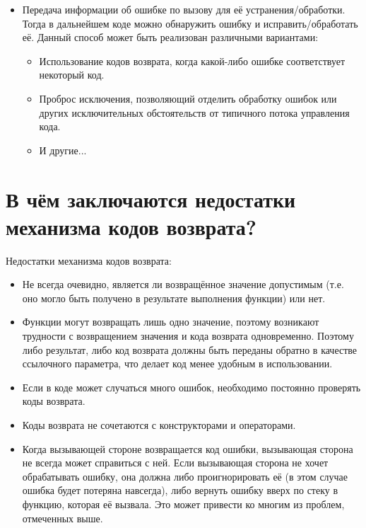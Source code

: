 \documentclass[a4paper,12pt]{article}	%
\begin{document}
\begin{itemize}
		\item Передача информации об ошибке по вызову для её устранения/обработки. Тогда в дальнейшем коде можно обнаружить ошибку и исправить/обработать её. Данный способ может быть реализован различными вариантами:

		\begin{itemize}
		
			\item Использование кодов возврата, когда какой-либо ошибке соответствует некоторый код.

			\item Проброс исключения, позволяющий отделить обработку ошибок или других исключительных обстоятельств от типичного потока управления кода.
		
			\item И другие...
	
		\end{itemize}
	
	\end{itemize}

\newpage

\section{В чём заключаются недостатки механизма кодов возврата?}
		
	Недостатки механизма кодов возврата:
	
	\begin{itemize}
	
		\item Не всегда очевидно, является ли возвращённое значение допустимым (т.е. оно могло быть получено в результате выполнения функции) или нет.
		
		\item Функции могут возвращать лишь одно значение, поэтому возникают трудности с возвращением значения и кода возврата одновременно. Поэтому либо результат, либо код возврата должны быть переданы обратно в качестве ссылочного параметра, что делает код менее удобным в использовании.
	
		\item Если в коде может случаться много ошибок, необходимо постоянно проверять коды возврата.
		
		\item Коды возврата не сочетаются с конструкторами и операторами.

		\item Когда вызывающей стороне возвращается код ошибки, вызывающая сторона не всегда может справиться с ней. Если вызывающая сторона не хочет обрабатывать ошибку, она должна либо проигнорировать её (в этом случае ошибка будет потеряна навсегда), либо вернуть ошибку вверх по стеку в функцию, которая её вызвала. Это может привести ко многим из проблем, отмеченных выше.	
	
	\end{itemize}
\end{document}
